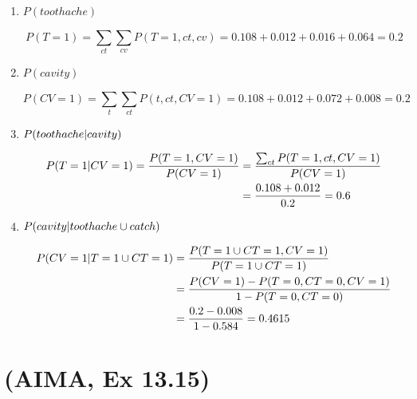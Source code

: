 \documentclass[11pt, a4paper]{article}
\begin{document}
\begin{enumerate}
    \item $P(toothache)$

    \begin{solution}
        \begin{equation*}
            P(T = 1) = \sum_{ct} \sum_{cv} P(T = 1, ct, cv) = 0.108 + 0.012 + 0.016 + 0.064 = 0.2
        \end{equation*}
    \end{solution}

    \item $P(cavity)$

    \begin{solution}
        \begin{equation*}
            P(CV = 1) = \sum_{t} \sum_{ct} P(t, ct, CV = 1) = 0.108 + 0.012 + 0.072 + 0.008 = 0.2
        \end{equation*}
    \end{solution}

    \item $P(toothache \vert cavity)$

    \begin{solution}
        \begin{align*}
            P(T = 1 \vert CV = 1) = \frac{P(T = 1, CV = 1)}{P(CV = 1)} & = \frac{\sum_{ct} P(T = 1, ct, CV = 1)}{P(CV = 1)} \\
            & = \frac{0.108 + 0.012}{0.2} = 0.6
        \end{align*}
    \end{solution}

    \item $P(cavity \vert toothache \cup catch)$

    \begin{solution}
        \begin{align*}
            P(CV = 1 \vert T = 1 \cup CT = 1) & = \frac{P(T = 1 \cup CT = 1, CV = 1)}{P(T = 1 \cup CT = 1)} \\
            & = \frac{P(CV = 1) - P(T = 0, CT = 0, CV = 1)}{1 - P(T = 0, CT = 0)} \\
            & = \frac{0.2 - 0.008}{1 - 0.584} = \num{0.4615}
        \end{align*}
    \end{solution}

\end{enumerate}

\newpage

\section{(AIMA, Ex 13.15)}
\end{document}
